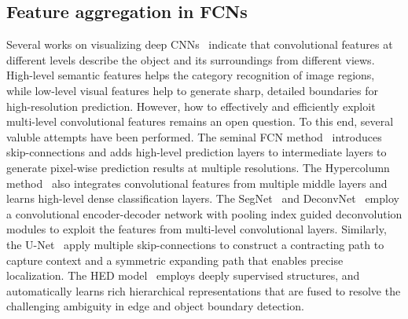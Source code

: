 \documentclass[10pt,twocolumn,letterpaper]{article}
\begin{document}
\subsection{Feature aggregation in FCNs}
Several works on visualizing deep CNNs~\cite{simonyan2013deep,zeiler2014visualizing,mahendran2015understanding,Wang2015Visual}  indicate that convolutional features at different levels describe the object and its surroundings from different views.
High-level semantic features helps the category recognition of image regions, while low-level visual features help to generate sharp, detailed boundaries for high-resolution prediction.
However, how to effectively and efficiently exploit multi-level convolutional features remains an open question. To this end, several valuble attempts have been performed.
The seminal FCN method~\cite{long2015fully} introduces skip-connections and adds high-level prediction layers to intermediate layers to generate pixel-wise prediction results at multiple resolutions.
The Hypercolumn method~\cite{hariharan2015hypercolumns} also integrates convolutional features from multiple middle layers and learns high-level dense classification layers.
The SegNet~\cite{segnet} and DeconvNet~\cite{noh2015learning} employ a convolutional encoder-decoder network with pooling index guided deconvolution modules to exploit the features from multi-level convolutional layers.
Similarly,~ the U-Net~\cite{ronneberger2015u} apply multiple skip-connections to construct a contracting path to capture context and a symmetric expanding path that enables precise localization.
The HED model~\cite{xie2015holistically} employs deeply supervised structures, and automatically learns rich hierarchical representations that are fused to resolve the challenging ambiguity in edge and object boundary detection.
\end{document}
